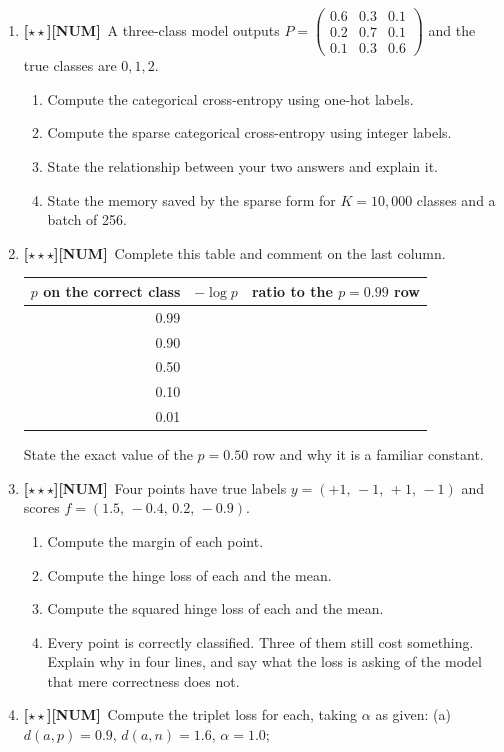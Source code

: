 \documentclass[11pt,a4paper]{article}
\newcommand{\LA}{{\footnotesize\textbf{[$\star\star\star$]}}}
\newcommand{\LB}{{\footnotesize\textbf{[$\star\star$]}}}
\newcommand{\NUM}{{\footnotesize\textbf{[NUM]}}}
\newcommand{\Q}[1]{\item[\textbf{#1}]}
\begin{document}
\begin{enumerate}[leftmargin=2.2cm]
\Q{U2.22}\LB\NUM\ A three-class model outputs
  $P = \begin{pmatrix} 0.6 & 0.3 & 0.1\\ 0.2 & 0.7 & 0.1\\ 0.1 & 0.3 & 0.6\end{pmatrix}$
  and the true classes are $0, 1, 2$.
  \begin{enumerate}[label=(\alph*)]
    \item Compute the categorical cross-entropy using one-hot labels.
    \item Compute the sparse categorical cross-entropy using integer labels.
    \item State the relationship between your two answers and explain it.
    \item State the memory saved by the sparse form for $K = 10{,}000$ classes
      and a batch of 256.
  \end{enumerate}
\Q{U2.23}\LA\NUM\ Complete this table and comment on the last column.
  \begin{center}\begin{tabular}{@{}rrr@{}}\toprule
  $p$ on the correct class & $-\log p$ & ratio to the $p=0.99$ row\\
  \midrule
  0.99 & & \\ 0.90 & & \\ 0.50 & & \\ 0.10 & & \\ 0.01 & & \\
  \bottomrule\end{tabular}\end{center}
  State the exact value of the $p = 0.50$ row and why it is a familiar
  constant.
\Q{U2.24}\LA\NUM\ Four points have true labels $y = (+1,\,-1,\,+1,\,-1)$ and
  scores $f = (1.5,\,-0.4,\,0.2,\,-0.9)$.
  \begin{enumerate}[label=(\alph*)]
    \item Compute the margin of each point.
    \item Compute the hinge loss of each and the mean.
    \item Compute the squared hinge loss of each and the mean.
    \item Every point is correctly classified. Three of them still cost
      something. Explain why in four lines, and say what the loss is asking of
      the model that mere correctness does not.
  \end{enumerate}
\Q{U2.25}\LB\NUM\ Compute the triplet loss for each, taking $\alpha$ as given:
  (a) $d(a,p) = 0.9$, $d(a,n) = 1.6$, $\alpha = 1.0$;

\end{enumerate}
\end{document}
